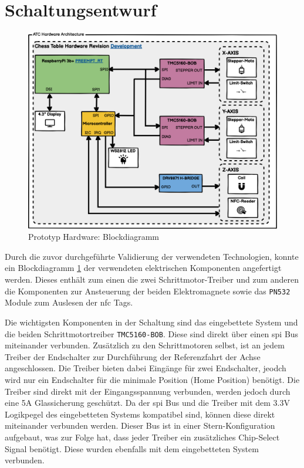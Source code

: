 \hypertarget{schaltungsentwurf}{%
\section{Schaltungsentwurf}\label{schaltungsentwurf}}

\begin{figure}
\centering
\includegraphics{images/ATC_Hardware_Architecture_DK.png}
\caption{Prototyp Hardware: Blockdiagramm
\label{ATC_Hardware_Architecture_DK}}
\end{figure}

Durch die zuvor durchgeführte Validierung der verwendeten Technologien,
konnte ein Blockdiagramm \ref{ATC_Hardware_Architecture_DK} der
verwendeten elektrischen Komponenten angefertigt werden. Dieses enthält
zum einen die zwei Schrittmotor-Treiber und zum anderen die Komponenten
zur Ansteuerung der beiden Elektromagnete sowie das
\passthrough{\lstinline!PN532!} Module zum Auslesen der \gls{nfc} Tags.

Die wichtigsten Komponenten in der Schaltung sind das eingebettete
System und die beiden Schrittmotortreiber
\passthrough{\lstinline!TMC5160-BOB!}. Diese sind direkt über einen
\gls{spi} Bus miteinander verbunden. Zusätzlich zu den Schrittmotoren
selbst, ist an jedem Treiber der Endschalter zur Durchführung der
Referenzfahrt der Achse angeschlossen. Die Treiber bieten dabei Eingänge
für zwei Endschalter, jeodch wird nur ein Endschalter für die minimale
Position (Home Position) benötigt. Die Treiber sind direkt mit der
Eingangsspannung verbunden, werden jedoch durch eine 5A Glassicherung
geschützt. Da der \gls{spi} Bus und die Treiber mit dem 3.3V Logikpegel
des eingebetteten Systems kompatibel sind, können diese direkt
miteinander verbunden werden. Dieser Bus ist in einer
Stern-Konfiguration aufgebaut, was zur Folge hat, dass jeder Treiber ein
zusätzliches Chip-Select Signal benötigt. Diese wurden ebenfalls mit dem
eingebetteten System verbunden.


